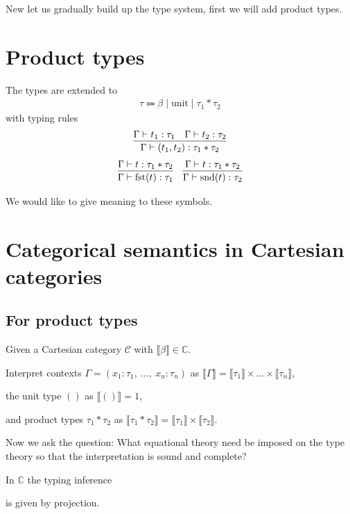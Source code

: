 New let us gradually build up the type system, first we will add product types.

\section{Product types}

The types are extended to
\begin{align*}
    \tau \Coloneqq \beta \mid \text{unit} \mid \tau_1 \ast \tau_2
\end{align*}
with typing rules
\begin{align*}
    \infer{\Gamma \vdash (t_1, t_2) : \tau_1 \ast \tau_2}{\Gamma \vdash t_1 :
    \tau_1 & \Gamma \vdash t_2 : \tau_2}
\end{align*}
\begin{align*}
    \infer{\Gamma \vdash \text{fst}(t) : \tau_1}{\Gamma \vdash t : \tau_1 \ast
    \tau_2}
    &&
    \infer{\Gamma \vdash \text{snd}(t) : \tau_2}{\Gamma \vdash t : \tau_1 \ast
    \tau_2}
\end{align*}

We would like to give meaning to these symbols.

\section{Categorical semantics in Cartesian categories}

\subsection{For product types}

Given a Cartesian category $\mathcal{C}$ with $\llbracket \beta \rrbracket \in
\mathbb{C}$.

Interpret contexts $\Gamma = (x_1 : \tau_1,\ \ldots,\ x_n :
\tau_n)$ as $\llbracket \Gamma \rrbracket = \llbracket \tau_1 \rrbracket \times
\ldots \times \llbracket \tau_n \rrbracket$,

the unit type $()$ as $\llbracket () \rrbracket = 1$,

and product types $\tau_1 \ast \tau_2$ as $\llbracket \tau_1 \ast \tau_2
\rrbracket = \llbracket \tau_1 \rrbracket \times \llbracket \tau_2 \rrbracket$.

Now we ask the question: What equational theory need be imposed on the type
theory so that the interpretation is sound and complete?

In $\mathbb{C}$ the typing inference
is given by projection.

